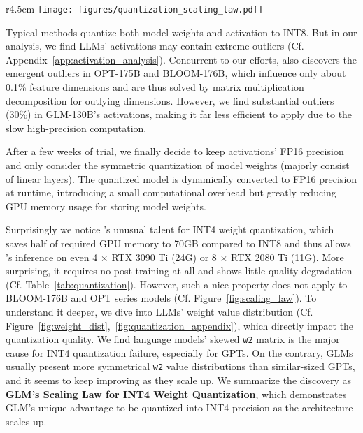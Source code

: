 {\begin{table*}[t]
\begin{subtable}
\begin{threeparttable}
    \end{threeparttable}
    \end{subtable}
    \vspace{-4mm}
\label{tab:quantization}
\end{table*}
\begin{wrapfigure}{r}{4.5cm}
    \small
    \vspace{-5mm}
    \centering
    \texttt{[image: figures/quantization\_scaling\_law.pdf]}
    \vspace{-4mm}
    \caption{\glm's INT4 weight quantization scaling law.}
    \label{fig:scaling_law}
    \vspace{-8mm}
\end{wrapfigure}

Typical methods quantize both model weights and activation to INT8.%
But in our analysis, we find LLMs' activations may contain extreme outliers (Cf. Appendix~\ref{app:activation_analysis}).
Concurrent to our efforts, \citep{dettmers2022llm} also discovers the emergent outliers in OPT-175B and BLOOM-176B, which influence only about 0.1\% feature dimensions and are thus solved by matrix multiplication decomposition for outlying dimensions.
However, we find substantial outliers (30\%) in GLM-130B's activations, making it far less efficient to apply due to the slow high-precision computation.

After a few weeks of trial, we finally decide to keep activations' FP16 precision and only consider the symmetric quantization of model weights (majorly consist of linear layers). 
The quantized model is dynamically converted to FP16 precision at runtime, introducing a small computational overhead but greatly reducing GPU memory usage for storing model weights.

Surprisingly we notice \glm's unusual talent for INT4 weight quantization, which saves half of required GPU memory to 70GB compared to INT8 and thus allows \glm's inference on even 4 $\times$ RTX 3090 Ti (24G) or 8 $\times$ RTX 2080 Ti (11G).
More surprising, it requires no post-training at all and shows little quality degradation (Cf. Table~\ref{tab:quantization}).
However, such a nice property does not apply to BLOOM-176B and OPT series models (Cf. Figure~\ref{fig:scaling_law}).
To understand it deeper, we dive into LLMs' weight value distribution (Cf. Figure~\ref{fig:weight_dist},~\ref{fig:quantization_appendix}), which directly impact the quantization quality.
We find language models' skewed \texttt{w2} matrix is the major cause for INT4 quantization failure, especially for GPTs.
On the contrary, GLMs usually present more symmetrical \texttt{w2} value distributions than similar-sized GPTs, and it seems to keep improving as they scale up.
We summarize the discovery as \textbf{GLM's Scaling Law for INT4 Weight Quantization}, which demonstrates GLM's unique advantage to be quantized into INT4 precision as the architecture scales up.

}
